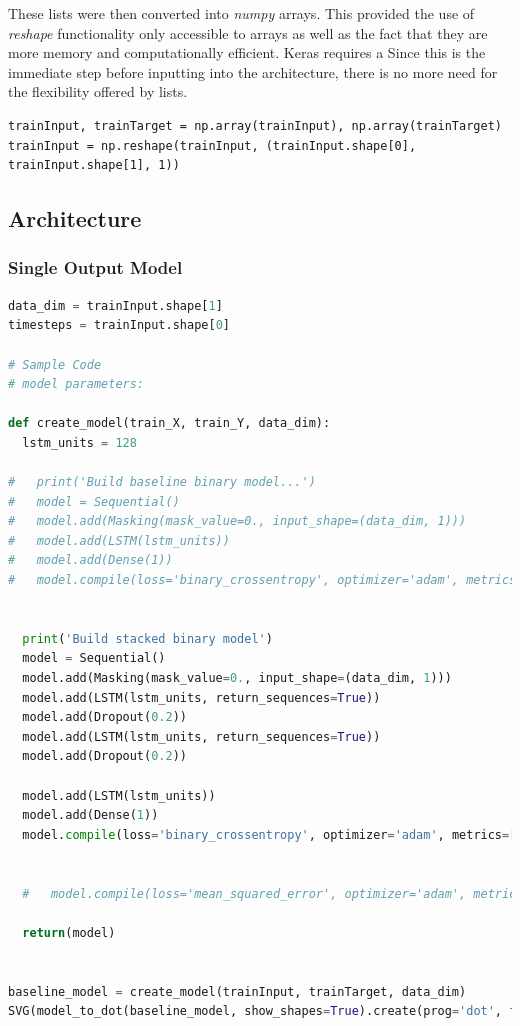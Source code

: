 \documentclass[10pt,onecolumn,letterpaper]{article}
\begin{document}
These lists were then converted into \textit{numpy} arrays. This provided the use of \textit{reshape} functionality only accessible to arrays as well as the fact that they are more memory and computationally efficient. Keras requires a Since this is the immediate step before inputting into the architecture, there is no more need for the flexibility offered by lists. 

\begin{lstlisting} 
trainInput, trainTarget = np.array(trainInput), np.array(trainTarget)
trainInput = np.reshape(trainInput, (trainInput.shape[0], trainInput.shape[1], 1))
\end{lstlisting} 





\subsection{Architecture} 
\subsubsection{Single Output Model}

\begin{lstlisting}[language=Python, breaklines=true]
data_dim = trainInput.shape[1]
timesteps = trainInput.shape[0]

# Sample Code
# model parameters:

def create_model(train_X, train_Y, data_dim):
  lstm_units = 128
  
#   print('Build baseline binary model...')
#   model = Sequential()
#   model.add(Masking(mask_value=0., input_shape=(data_dim, 1)))
#   model.add(LSTM(lstm_units))
#   model.add(Dense(1))
#   model.compile(loss='binary_crossentropy', optimizer='adam', metrics=['accuracy'])
  
  
  print('Build stacked binary model')
  model = Sequential()
  model.add(Masking(mask_value=0., input_shape=(data_dim, 1)))
  model.add(LSTM(lstm_units, return_sequences=True))
  model.add(Dropout(0.2))
  model.add(LSTM(lstm_units, return_sequences=True))
  model.add(Dropout(0.2))

  model.add(LSTM(lstm_units))
  model.add(Dense(1))
  model.compile(loss='binary_crossentropy', optimizer='adam', metrics=['accuracy'])

  
  #   model.compile(loss='mean_squared_error', optimizer='adam', metrics=['accuracy'])

  return(model)

  
baseline_model = create_model(trainInput, trainTarget, data_dim)
SVG(model_to_dot(baseline_model, show_shapes=True).create(prog='dot', format='svg'))
\end{lstlisting} 
\end{document}

